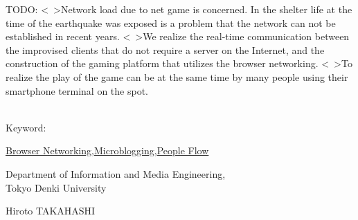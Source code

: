 TODO:
<\ >Network load due to net game is concerned. In the shelter life at the time of the earthquake was exposed is a problem that the network can not be established in recent years.
<\ >We realize the real-time communication between the improvised clients that do not require a server on the Internet, and the construction of the gaming platform that utilizes the browser networking.
<\ >To realize the play of the game can be at the same time by many people using their smartphone terminal on the spot.
\\\\

\begin{flushleft}Keyword:\\
\end{flushleft}
{\underline{Browser Networking},\underline{Microblogging},\underline{People Flow}}

\begin{flushright}
\vspace{10mm}

\vspace{5mm}
\large Department of Information and Media Engineering,\\
Tokyo Denki University\\
\begin{flushright}\LARGE Hiroto TAKAHASHI\\
\end{flushright}

\end{flushright}
